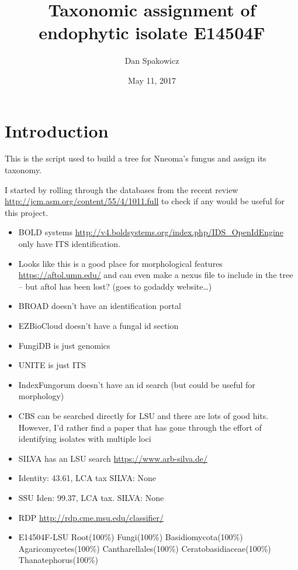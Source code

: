 \documentclass[11pt,]{article}
\title{Taxonomic assignment of endophytic isolate E14504F}
\author{Dan Spakowicz}
\date{May 11, 2017}
\providecommand{\tightlist}{%
  \setlength{\itemsep}{0pt}\setlength{\parskip}{0pt}}
\begin{document}
\maketitle

\section{Introduction}\label{introduction}

This is the script used to build a tree for Nneoma's fungus and assign
its taxonomy.

I started by rolling through the databases from the recent review
\url{http://jcm.asm.org/content/55/4/1011.full} to check if any would be
useful for this project.

\begin{itemize}
\tightlist
\item
  BOLD systems
  \url{http://v4.boldsystems.org/index.php/IDS_OpenIdEngine} only have
  ITS identification.
\item
  Looks like this is a good place for morphological features
  \url{https://aftol.umn.edu/} and can even make a nexus file to include
  in the tree -- but aftol has been lost? (goes to godaddy
  website\ldots{})
\item
  BROAD doesn't have an identification portal
\item
  EZBioCloud doesn't have a fungal id section
\item
  FungiDB is just genomics
\item
  UNITE is just ITS
\item
  IndexFungorum doesn't have an id search (but could be useful for
  morphology)
\item
  CBS can be searched directly for LSU and there are lots of good hits.
  However, I'd rather find a paper that has gone through the effort of
  identifying isolates with multiple loci
\item
  SILVA has an LSU search \url{https://www.arb-silva.de/}
\item
  Identity: 43.61, LCA tax SILVA: None
\item
  SSU Iden: 99.37, LCA tax. SILVA: None
\item
  RDP \url{http://rdp.cme.msu.edu/classifier/}
\item
  E14504F-LSU Root(100\%) Fungi(100\%) Basidiomycota(100\%)
  Agaricomycetes(100\%) Cantharellales(100\%) Ceratobasidiaceae(100\%)
  Thanatephorus(100\%)
\end{itemize}
\end{document}
